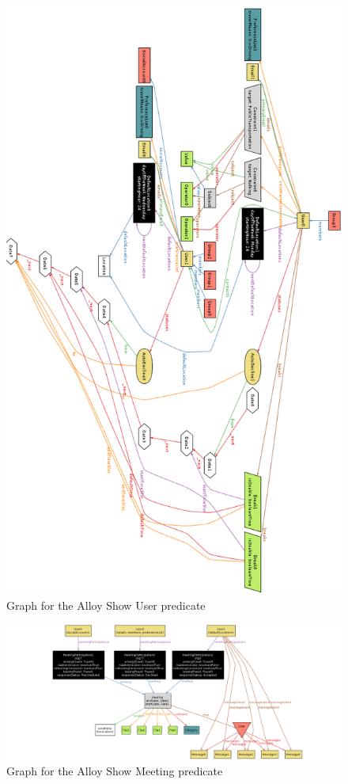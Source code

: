 \begin{figure}
	\vspace*{-0.5cm}
	\centering\includegraphics[height=\textheight]{Images/AlloyShowUser.png}
	\caption{Graph for the Alloy Show User predicate}
\end{figure}

\begin{figure}
	\hspace*{-5cm}
	\centering\includegraphics[scale=0.48]{Images/AlloyShowMeeting2.png}
	\caption{Graph for the Alloy Show Meeting predicate}
\end{figure}

